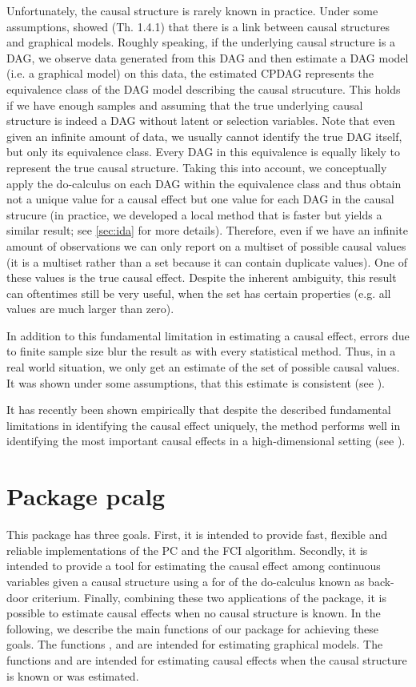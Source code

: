 \documentclass[article]{jss}
\begin{document}
Unfortunately, the causal structure is rarely known in practice. Under some
assumptions, \cite{Pearl00} showed (Th. 1.4.1) that there is a link between
causal structures and graphical models. Roughly speaking, if the underlying
causal structure is a DAG, we observe data generated from this DAG and then
estimate a DAG model (i.e. a graphical model) on this data, the estimated
CPDAG represents the equivalence class of the DAG model describing the
causal strucuture. This holds if we have enough samples and assuming that
the true underlying causal structure is indeed a DAG without latent or
selection variables. Note that even given an infinite amount of data, we
usually cannot identify the true DAG itself, but only its equivalence
class. Every DAG in this equivalence is equally likely to represent the
true causal structure. Taking this into account, we conceptually apply the
do-calculus on each DAG within the equivalence class and thus obtain not a
unique value for a causal effect but one value for each DAG in the causal
strucure (in practice, we developed a local method that is faster but
yields a similar result; see \ref{sec:ida} for more details). Therefore,
even if we have an infinite amount of observations we can only report on a
multiset of possible causal values (it is a multiset rather than a set
because it can contain duplicate values). One of these values is the true
causal effect. Despite the inherent ambiguity, this result can oftentimes
still be very useful, when the set has certain properties (e.g. all values
are much larger than zero).

In addition to this fundamental limitation in estimating a causal effect,
errors due to finite sample size blur the result as with every statistical
method. Thus, in a real world situation, we only get an estimate of the set
of possible causal values. It was shown under some assumptions, that this
estimate is consistent (see \cite{BuKaMa10}).

It has recently been shown empirically that despite the described
fundamental limitations in identifying the causal effect uniquely, the
method performs well in identifying the most important causal effects in a
high-dimensional setting (see \cite{NatMethods10}).

\section{Package pcalg}
This package has three goals. First, it is intended to provide fast,
flexible and reliable implementations of the PC and the FCI
algorithm. Secondly, it is intended to provide a tool for estimating the
causal effect among continuous variables given a causal structure
using a for of the do-calculus known as back-door criterium. Finally, combining
these two applications of the package, it is possible to estimate causal
effects when no causal structure is known. In the following, we describe
the main functions of our package for achieving these goals. The functions
,  and  are intended for estimating
graphical models. The functions  and  are intended
for estimating causal effects when the causal structure is known or was
estimated.
\end{document}
